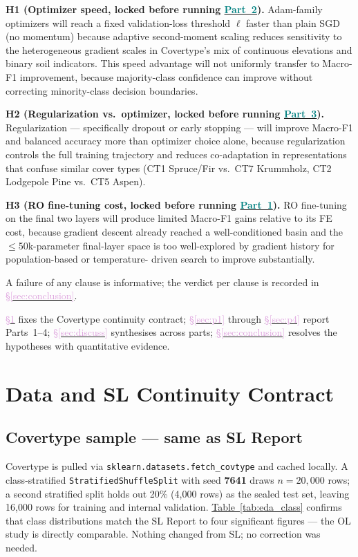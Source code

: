 \documentclass[conference]{IEEEtran}
\newcommand{\tabref}[1]{\hyperref[#1]{\textcolor{sage}{Table~\ref*{#1}}}}
\newcommand{\secref}[1]{\hyperref[#1]{\textcolor{plum}{\S\ref*{#1}}}}
\newcommand{\partref}[2]{\hyperref[#2]{\textcolor{teal}{Part~#1}}}
\begin{document}
\textbf{H1 (Optimizer speed, locked before running \partref{2}{sec:p2}).}
Adam-family optimizers will reach a fixed validation-loss threshold $\ell$
faster than plain SGD (no momentum) because adaptive second-moment scaling
\cite{kingma2014adam} reduces sensitivity to the heterogeneous gradient scales
in Covertype's mix of continuous elevations and binary soil indicators.
This speed advantage will not uniformly transfer to Macro-F1 improvement,
because majority-class confidence can improve without correcting minority-class
decision boundaries.

\textbf{H2 (Regularization vs.\ optimizer, locked before running \partref{3}{sec:p3}).}
Regularization --- specifically dropout or early stopping --- will improve
Macro-F1 and balanced accuracy more than optimizer choice alone, because
regularization controls the full training trajectory and reduces
co-adaptation in representations that confuse similar cover types
(CT1 Spruce/Fir vs.\ CT7 Krummholz, CT2 Lodgepole Pine vs.\ CT5 Aspen).

\textbf{H3 (RO fine-tuning cost, locked before running \partref{1}{sec:p1}).}
RO fine-tuning on the final two layers will produce limited Macro-F1 gains
relative to its FE cost, because gradient descent already reached a
well-conditioned basin and the $\leq$50k-parameter final-layer space is
too well-explored by gradient history for population-based or temperature-
driven search to improve substantially.

A failure of any clause is informative; the verdict per clause is
recorded in \secref{sec:conclusion}.

\secref{sec:data} fixes the Covertype continuity contract;
\secref{sec:p1} through \secref{sec:p4} report Parts~1--4;
\secref{sec:discuss} synthesises across parts;
\secref{sec:conclusion} resolves the hypotheses with quantitative evidence.

\section{Data and SL Continuity Contract}\label{sec:data}

\subsection{Covertype sample --- same as SL Report}\label{sec:data:sample}
Covertype is pulled via \texttt{sklearn.datasets.fetch\_covtype} and cached
locally.
A class-stratified \texttt{StratifiedShuffleSplit} with seed \textbf{7641}
draws $n{=}20{,}000$ rows; a second stratified split holds out 20\%
(4{,}000 rows) as the sealed test set, leaving 16{,}000 rows for training
and internal validation.
\tabref{tab:eda_class} confirms that class distributions match the SL Report
to four significant figures --- the OL study is directly comparable.
Nothing changed from SL; no correction was needed.
\end{document}
